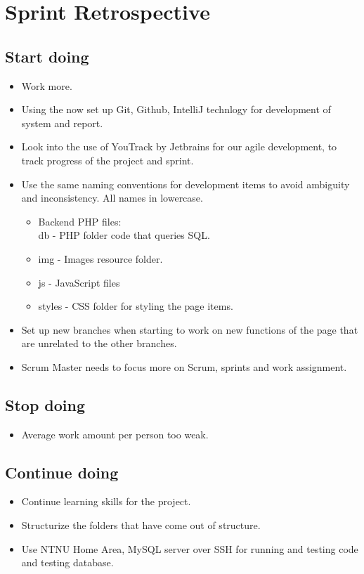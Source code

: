 \documentclass[11pt]{report}
\begin{document}
\section{Sprint Retrospective} 

\subsection{Start doing}
\begin{itemize}
\item Work more. 
\item Using the now set up Git, Github, IntelliJ technlogy for development of system and report. 
\item Look into the use of YouTrack by Jetbrains for our agile development, to track progress of the project and sprint. 
\item Use the same naming conventions for development items to avoid ambiguity and inconsistency. All names in lowercase. 
\begin{itemize}
\item Backend PHP files: \\ db - PHP folder code that queries SQL. 
\item img - Images resource folder. 
\item js - JavaScript files
\item styles - CSS folder for styling the page items. 
\end{itemize}
\item Set up new branches when starting to work on new functions of the page that are unrelated to the other branches. 
\item Scrum Master needs to focus more on Scrum, sprints and work assignment. \\
\end{itemize}

\subsection{Stop doing}
\begin{itemize}
\item Average work amount per person too weak.  \\
\end{itemize}

\subsection{Continue doing}
\begin{itemize}
\item Continue learning skills for the project.
\item Structurize the folders that have come out of structure. 
\item Use NTNU Home Area, MySQL server over SSH for running and testing code and testing database. \\
\end{itemize}
\end{document}
